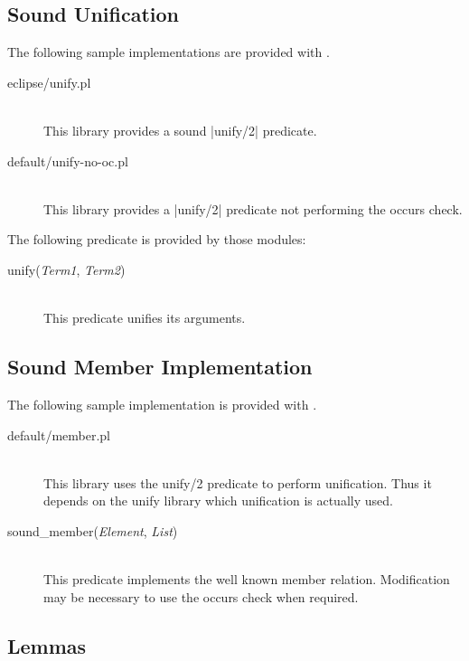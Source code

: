 \subsection{Sound Unification}

The following sample implementations are provided with \ProCom.
\begin{description}
  \item [eclipse/unify.pl]\ 
    \\
    This library provides a sound |unify/2| predicate.
  \item [default/unify-no-oc.pl]\ 
    \\
    This library provides a |unify/2| predicate not performing the occurs
    check.
\end{description}

The following predicate is provided by those modules:

\begin{description}
  \item [unify({\em Term1}, {\em Term2})]\ 
    \\
    This predicate unifies its arguments.
\end{description}



\subsection{Sound Member Implementation}\label{sec:member}

The following sample implementation is provided with \ProCom.
\begin{description}
  \item [default/member.pl]\ 
    \\
    This library uses the unify/2 predicate to perform unification. Thus it
    depends on the unify library which unification is actually used.
\end{description}

\begin{description}
  \item [sound\_member({\em Element}, {\em List})]\ 
    \\
    This predicate implements the well known member relation. Modification may
    be necessary to use the occurs check when required.
\end{description}


\subsection{Lemmas}\label{sec:lib.lemma}

